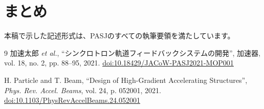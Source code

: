 \documentclass{PASJ2026}
\begin{document}
\section{まとめ}
本稿で示した記述形式は、PASJのすべての執筆要領を満たしています。

\begin{thebibliography}{9}
加速太郎 \textit{et al.}, ``シンクロトロン軌道フィードバックシステムの開発'', 加速器, vol. 18, no. 2, pp. 88--95, 2021. \url{doi:10.18429/JACoW-PASJ2021-MOP001}

H. Particle and T. Beam, ``Design of High-Gradient Accelerating Structures'', \textit{Phys. Rev. Accel. Beams}, vol. 24, p. 052001, 2021. \url{doi:10.1103/PhysRevAccelBeams.24.052001}
\end{thebibliography}
\end{document}
